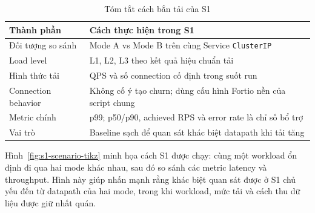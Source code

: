 \begin{table}[H]
\centering
\caption{Tóm tắt cách bắn tải của S1}
\label{tab:s1-load-profile}
\small
\renewcommand{\arraystretch}{1.15}
\begin{tabularx}{\textwidth}{>{\raggedright\arraybackslash}p{3.2cm}X}
\toprule
\textbf{Thành phần} & \textbf{Cách thực hiện trong S1} \\
\midrule
Đối tượng so sánh & Mode A vs Mode B trên cùng Service \texttt{ClusterIP} \\
Load level & L1, L2, L3 theo kết quả hiệu chuẩn tải \\
Hình thức tải & QPS và số connection cố định trong suốt run \\
Connection behavior & Không cố ý tạo churn; dùng cấu hình Fortio nền của script chung \\
Metric chính & p99; p50/p90, achieved RPS và error rate là chỉ số bổ trợ \\
Vai trò & Baseline sạch để quan sát khác biệt datapath khi tải tăng \\
\bottomrule
\end{tabularx}
\end{table}

Hình~\ref{fig:s1-scenario-tikz} minh họa cách S1 được chạy: cùng một workload ổn định đi qua hai mode khác nhau, sau đó so sánh các metric latency và throughput. Hình này giúp nhấn mạnh rằng khác biệt quan sát được ở S1 chủ yếu đến từ datapath của hai mode, trong khi workload, mức tải và cách thu dữ liệu được giữ nhất quán.

